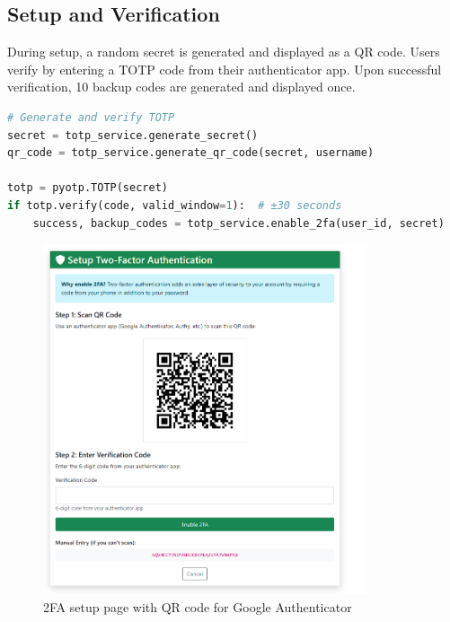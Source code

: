 \documentclass[12pt,a4paper]{article}
\begin{document}
\subsection{Setup and Verification}

During setup, a random secret is generated and displayed as a QR code. Users verify by entering a TOTP code from their authenticator app. Upon successful verification, 10 backup codes are generated and displayed once.

\begin{lstlisting}[language=Python]
# Generate and verify TOTP
secret = totp_service.generate_secret()
qr_code = totp_service.generate_qr_code(secret, username)

totp = pyotp.TOTP(secret)
if totp.verify(code, valid_window=1):  # ±30 seconds
    success, backup_codes = totp_service.enable_2fa(user_id, secret)
\end{lstlisting}

\begin{figure}[H]
    \centering
    \includegraphics[width=0.85\textwidth]{SCREENSHOTs/2fa.png}
    \caption{2FA setup page with QR code for Google Authenticator}
    \label{fig:2fa_setup}
\end{figure}
\end{document}
